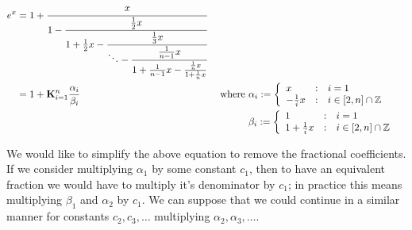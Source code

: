 \begin{align}
e^x &= 1 + \cfrac{x}{1 -
		   \cfrac{\frac{1}{2}x}{1 + \frac{1}{2}x - 
		   \cfrac{\frac{1}{3}x}{\ddots - 
		   \cfrac{\frac{1}{n-1}x}{1 + \frac{1}{n-1}x - 
		   \frac{\frac{1}{n}x}{1 + \frac{1}{n}x} } } } }
		   \label{EQN_"exp cont frac 1"}\\
	&= 1 + \mathbf{K}_{i=1}^n\frac{\alpha_i}{\beta_i} &\textrm{ where }
		&\alpha_i := \left\{\begin{array}{lcl}
			x&:&i=1\\
			-\frac{1}{i}x &:& i \in [2, n]\cap\mathbb{Z}
			\end{array}\right.\nonumber\\
	&	&&\beta_i := \left\{\begin{array}{lcl}
			1 &:& i=1\\
			1 + \frac{1}{i}x &:& i \in [2,n]\cap\mathbb{Z}
			\end{array}\right.\nonumber
\end{align}

We would like to simplify the above equation to remove the fractional coefficients. If we consider multiplying \(\alpha_1\) by some constant \(c_1\), then to have an equivalent fraction we would have to multiply it's denominator by \(c_1\); in practice this means multiplying \(\beta_1\) and \(\alpha_2\) by \(c_1\). We can suppose that we could continue in a similar manner for constants \(c_2, c_3, \ldots\) multiplying \(\alpha_2, \alpha_3, \ldots\).

